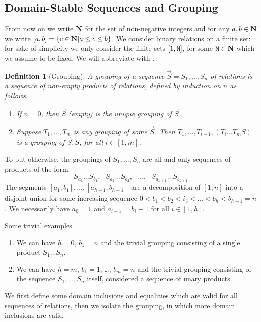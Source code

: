 \documentclass{lmcs}
\newtheorem{definition}[theorem]{Definition}
\begin{document}
\subsection{Domain-Stable Sequences and Grouping}
From now on we write ${\bf N}$ for the set of non-negative integers and for any $a,b \in {\bf N}$
we write $[a,b] = \{c \in {\bf N} | a \le c \le b\}$. 
We consider binary relations on a finite set: for sake of simplicity we only 
consider the finite sets $[1,{\tt M}]$, for some ${\tt M} \in {\bf N}$ which we assume to be
fixed. We will abbreviate  with
. 

\begin{definition}[Grouping]
A grouping of a sequence $\vec{S} = S_1, \ldots, S_n$ of relations is a sequence
of non-empty products of relations, defined by induction on $n$ as follows.
\begin{enumerate}
\item
If $n=0$, then $\vec{S}$ (empty) is the unique grouping of $\vec{S}$.
\item
Suppose $T_1, \ldots, T_m$ is any grouping of some $\vec{S}$. 
Then $T_1, \ldots, T_{i-1}, (T_i \ldots T_m S)$ is a grouping of 
$\vec{S},S$, for all $i \in [1,m]$. 
\end{enumerate}
\end{definition}

To put otherwise, the groupings of $S_1, \ldots, S_n$ are all and only 
sequences of products of the form: 
$$
S_{a_1} \ldots S_{b_1}, \ \ \ 
S_{a_2} \ldots S_{b_2}, \ \ \ 
\ldots, \ \ \ 
S_{a_{h+1}} \ldots S_{b_{h+1}}
$$
The segments $[a_1,b_1], \ldots, [a_{h+1},b_{h+1}]$ are a decomposition
of $[1,n]$ into a disjoint union for some increasing sequence 
$0 < b_1 < b_2 < i_3 < \ldots < b_h < b_{h+1} = n$. We necessarily have
$a_0=1$ and $a_{i+1} = b_i+1$ for all $i \in [1,h]$. 

Some trivial examples. 
\begin{enumerate}
\item
We can have $h=0$, $b_1=n$ and the trivial grouping consisting of a single product  
$S_1 \ldots S_n$. 
\item
We can have $h=m$, $b_1=1$, \ldots, $b_m=n$ and the trivial grouping consisting of the 
sequence $S_1, \ldots, S_n$ itself, considered a sequence of unary products.
\end{enumerate}

We first define some domain inclusions and equalities 
which are valid for all sequences of relations, then we isolate the 
grouping, in which more domain inclusions are valid. 
\end{document}
